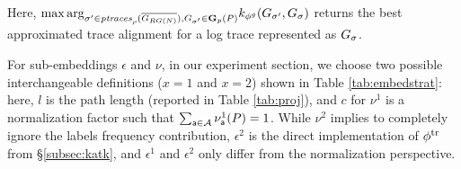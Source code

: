 %
Here, ${\max\arg}_{\nonlogtrace\in \WCal{\pmin}{n}, G_\nonlogtrace\in\TBf{p}{n}(P)} k_{\gorgembed}(G_\nonlogtrace, G_{\logtrace})$ returns the best approximated trace alignment for a log trace represented as $G_{\logtrace}$. %
%
\begin{table}[!t]
	\caption{Different sub-embedding definitions ($\epsilon^1$, $\epsilon^2$, $\nu^1$, and $\nu^2$) for $\gorgembed$}\label{tab:embedstrat}
	\centering
\end{table}
%
For sub-embeddings $\epsilon$ and $\nu$, {in our experiment section}, we choose two possible interchangeable definitions ($x=1$ and $x=2$) shown in Table \ref{tab:embedstrat}: here, $l$ is the path length (reported in Table \ref{tab:proj}), and $c$ for $\nu^1$ is a normalization factor such that $\sum_{\const{a}\in\mathcal{A}}\nu^1_\const{a}(P)=1$. While $\nu^2$ implies to completely ignore the labels frequency contribution, $\epsilon^2$ is the direct implementation of $\trembed$ from \S\ref{subsec:katk}, and $\epsilon^1$ and $\epsilon^2$ only differ from the normalization perspective. %



